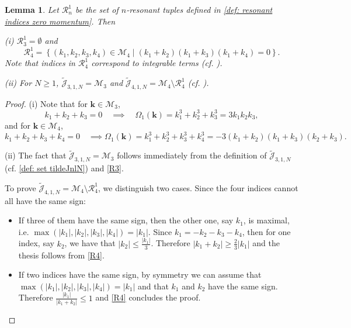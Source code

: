 \documentclass[a4paper,10pt,reqno]{article}
\theoremstyle{definition}
\theoremstyle{plain}
\theoremstyle{plain}
\theoremstyle{definition}
\theoremstyle{plain}
\theoremstyle{plain}
\theoremstyle{plain}
\newtheorem{lemma}[definition]{Lemma}
\theoremstyle{definition}
\theoremstyle{definition}
\def \M{\mathcal{M}}
\def \J{\mathcal{J}}
\def \k{\bm{k}}
\begin{document}
\begin{lemma} \label{lemma: orders 3 and 4}
Let $\mathcal{R}_n^1$ be the set of $n$-resonant tuples defined in \eqref{def: resonant indices zero momentum}. 
Then

\smallskip

\noindent (i) $\mathcal{R}_3^1 = \emptyset$ and  
\[
\mathcal{R}_4^1 = \left \{ (k_1,k_2,k_3,k_4)\in\M_4\mid (k_1+k_2)(k_1+k_3)(k_1+k_4) = 0\right \}.
\]
Note that indices in $\mathcal{R}_4^1$ correspond to integrable terms (cf. ).

\smallskip

\noindent (ii) For $N\geq 1$, $\widetilde{\mathcal{J}}_{3,1,N} = \M_3$ and $\widetilde{\mathcal{J}}_{4,1,N} = \mathcal{M}_4 \setminus \mathcal{R}_4^1$ (cf. ).
\end{lemma}
\begin{proof}
\noindent (i) Note that for $\k \in \M_3$,
\begin{equation}\label{R3}
k_1+k_2+k_3=0 \quad \implies \quad \Omega_1(\k)=k_1^3+k_2^3+k_3^3 = 3k_1k_2k_3,
\end{equation}
and for $\k \in \M_4$,
\begin{equation} \label{R4}
k_1+k_2+k_3+k_4=0 \quad \implies \Omega_1(\k)=k_1^3+k_2^3+k_3^3+k_4^3 = -3(k_1+k_2)(k_1+k_3)(k_2+k_3).
\end{equation}

\noindent (ii) The fact that $\widetilde{\J}_{3,1,N} = \M_3$ follows immediately from the definition of $\widetilde{\J}_{3,1,N}$ (cf. \eqref{def: set tildeJnlN}) and \eqref{R3}.

To prove $\widetilde{\J}_{4,1,N} = \mathcal{M}_4 \setminus \mathcal{R}_4^1$, we distinguish two cases. Since the four indices cannot all have the same sign:
\begin{itemize}
    \item If three of them have the same sign, then the other one, say $k_1$, is maximal, i.e. $\max{(|k_1|,|k_2|,|k_3|,|k_4|)}=|k_1|$. Since $k_1 = -k_2-k_3-k_4$, then for one index, say $k_2$, we have that $|k_2| \le \frac{|k_1|}{3}$. Therefore $|k_1+k_2| \ge \frac{2}{3}|k_1|$ and the thesis follows from \eqref{R4}.
 \item If two indices have the same sign, by symmetry we can assume that $\max{(|k_1|,|k_2|,|k_3|,|k_4|)}=|k_1|$ and that $k_1$ and $k_2$ have the same sign. Therefore $\frac{|k_1|}{|k_1+k_2|} \le 1$ and \eqref{R4}  concludes the proof. 
 \end{itemize}
\end{proof}
\end{document}
